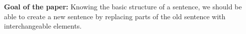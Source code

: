 \documentclass[11pt,a4paper]{article}
\begin{document}
  \textbf{Goal of the paper:}
  Knowing the basic structure of a sentence, we should be able to create a new sentence by replacing parts of the old sentence with interchangeable elements.



\newpage



\end{document}
